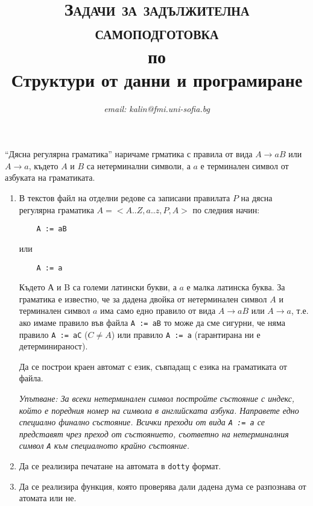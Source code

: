 \documentclass[12pt,a4paper]{article}
\author{\textit{email: kalin@fmi.uni-sofia.bg}}
\title{\textsc{Задачи за задължителна самоподготовка} \\
по \\
Структури от данни и програмиране}
\begin{document}
\maketitle


``Дясна регулярна граматика'' наричаме грматика с правила от вида $A \rightarrow aB$ или $A \rightarrow a$, където $A$ и $B$ са нетерминални символи, а $a$ е терминален символ от азбуката на граматиката.



\begin{enumerate}


	\item В текстов файл на отделни редове са записани правилата $P$ на дясна регулярна граматика $A=<A..Z,a..z,P,A>$ по следния начин:
	\begin{verbatim}
	A := aB
	\end{verbatim}

	или

	\begin{verbatim}
	A := a
	\end{verbatim}

	Където А и B са големи латински букви, а $a$ е малка латинска буква. За граматика е известно, че за дадена двойка от нетерминален символ $A$ и терминален символ $a$ има само едно правило от вида $A \rightarrow aB$ или $A \rightarrow a$, т.е. ако имаме правило във файла \texttt{A := aB} то може да сме сигурни, че няма правило \texttt{A := aC} ($C \neq A$) или правило \texttt{A := a} (гарантирана ни е детерминираност).

	Да се построи краен автомат с език, съвпадащ с езика на граматиката от файла.

	\emph{Упътване: За всеки нетерминален символ постройте състояние с индекс, който е поредния номер на символа в английската азбука. Направете едно специално финално състояние. Всички преходи от вида \texttt{A := a} се представят чрез преход от състоянието, съответно на нетерминалния символ \texttt{A} към специалното крайно състояние.}

	\item Да се реализира печатане на автомата в \texttt{dotty} формат.

	\item Да се реализира функция, която проверява дали дадена дума се разпознава от атомата или не.


\end{enumerate}
\end{document}
